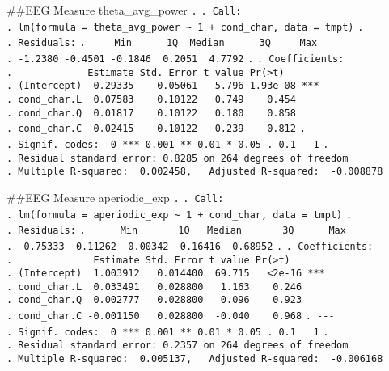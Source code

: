 \documentclass[
]{article}
\begin{document}
\#\#EEG Measure theta\_avg\_power \texttt{.} \texttt{.\ Call:}
\texttt{.\ lm(formula\ =\ theta\_avg\_power\ \textasciitilde{}\ 1\ +\ cond\_char,\ data\ =\ tmpt)}
\texttt{.} \texttt{.\ Residuals:}
\texttt{.\ \ \ \ \ Min\ \ \ \ \ \ 1Q\ \ Median\ \ \ \ \ \ 3Q\ \ \ \ \ Max}
\texttt{.\ -1.2380\ -0.4501\ -0.1846\ \ 0.2051\ \ 4.7792} \texttt{.}
\texttt{.\ Coefficients:}
\texttt{.\ \ \ \ \ \ \ \ \ \ \ \ \ Estimate\ Std.\ Error\ t\ value\ Pr(\textgreater{}\textbar{}t\textbar{})}
\texttt{.\ (Intercept)\ \ 0.29335\ \ \ \ 0.05061\ \ \ 5.796\ 1.93e-08\ ***}
\texttt{.\ cond\_char.L\ \ 0.07583\ \ \ \ 0.10122\ \ \ 0.749\ \ \ \ 0.454}
\texttt{.\ cond\_char.Q\ \ 0.01817\ \ \ \ 0.10122\ \ \ 0.180\ \ \ \ 0.858}
\texttt{.\ cond\_char.C\ -0.02415\ \ \ \ 0.10122\ \ -0.239\ \ \ \ 0.812}
\texttt{.\ -\/-\/-}
\texttt{.\ Signif.\ codes:\ \ 0\ \textquotesingle{}***\textquotesingle{}\ 0.001\ \textquotesingle{}**\textquotesingle{}\ 0.01\ \textquotesingle{}*\textquotesingle{}\ 0.05\ \textquotesingle{}.\textquotesingle{}\ 0.1\ \textquotesingle{}\ \textquotesingle{}\ 1}
\texttt{.}
\texttt{.\ Residual\ standard\ error:\ 0.8285\ on\ 264\ degrees\ of\ freedom}
\texttt{.\ Multiple\ R-squared:\ \ 0.002458,\ \ \ Adjusted\ R-squared:\ \ -0.008878}

\#\#EEG Measure aperiodic\_exp \texttt{.} \texttt{.\ Call:}
\texttt{.\ lm(formula\ =\ aperiodic\_exp\ \textasciitilde{}\ 1\ +\ cond\_char,\ data\ =\ tmpt)}
\texttt{.} \texttt{.\ Residuals:}
\texttt{.\ \ \ \ \ \ Min\ \ \ \ \ \ \ 1Q\ \ \ Median\ \ \ \ \ \ \ 3Q\ \ \ \ \ \ Max}
\texttt{.\ -0.75333\ -0.11262\ \ 0.00342\ \ 0.16416\ \ 0.68952}
\texttt{.} \texttt{.\ Coefficients:}
\texttt{.\ \ \ \ \ \ \ \ \ \ \ \ \ \ Estimate\ Std.\ Error\ t\ value\ Pr(\textgreater{}\textbar{}t\textbar{})}
\texttt{.\ (Intercept)\ \ 1.003912\ \ \ 0.014400\ \ 69.715\ \ \ \textless{}2e-16\ ***}
\texttt{.\ cond\_char.L\ \ 0.033491\ \ \ 0.028800\ \ \ 1.163\ \ \ \ 0.246}
\texttt{.\ cond\_char.Q\ \ 0.002777\ \ \ 0.028800\ \ \ 0.096\ \ \ \ 0.923}
\texttt{.\ cond\_char.C\ -0.001150\ \ \ 0.028800\ \ -0.040\ \ \ \ 0.968}
\texttt{.\ -\/-\/-}
\texttt{.\ Signif.\ codes:\ \ 0\ \textquotesingle{}***\textquotesingle{}\ 0.001\ \textquotesingle{}**\textquotesingle{}\ 0.01\ \textquotesingle{}*\textquotesingle{}\ 0.05\ \textquotesingle{}.\textquotesingle{}\ 0.1\ \textquotesingle{}\ \textquotesingle{}\ 1}
\texttt{.}
\texttt{.\ Residual\ standard\ error:\ 0.2357\ on\ 264\ degrees\ of\ freedom}
\texttt{.\ Multiple\ R-squared:\ \ 0.005137,\ \ \ Adjusted\ R-squared:\ \ -0.006168}
\end{document}
